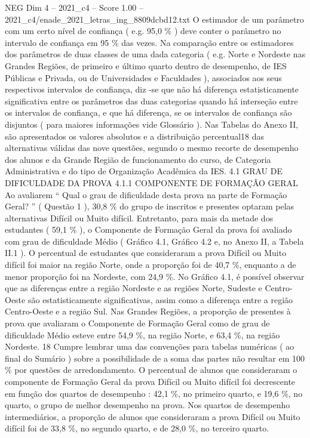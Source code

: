 \begin{textsample}{NEG Dim 4 – 2021\_c4 – Score 1.00 – 2021\_c4/enade\_2021\_letras\_ing\_8809dcbd12.txt}
O estimador de um parâmetro com um certo nível de confiança ( e.g. 95,0 \% ) deve conter o parâmetro no intervalo de confiança em 95 \% das vezes.
Na comparação entre os estimadores dos parâmetros de duas classes de uma dada categoria ( e.g.
Norte e Nordeste nas Grandes Regiões, de primeiro e último quarto dentro de desempenho, de IES Públicas e Privada, ou de Universidades e Faculdades ), associados aos seus respectivos intervalos de confiança, diz -se que não há diferença estatisticamente significativa entre os parâmetros das duas categorias quando há interseção entre os intervalos de confiança, e que há diferença, se os intervalos de confiança são disjuntos ( para maiores informações vide Glossário ).
Nas Tabelas do Anexo II, são apresentados os valores absolutos e a distribuição percentual18 das alternativas válidas das nove questões, segundo o mesmo recorte de desempenho dos alunos e da Grande Região de funcionamento do curso, de Categoria Administrativa e do tipo de Organização Acadêmica da IES. 4.1 GRAU DE DIFICULDADE DA PROVA 4.1.1 COMPONENTE DE FORMAÇÃO GERAL Ao avaliarem “ Qual o grau de dificuldade desta prova na parte de Formação Geral? ” ( Questão 1 ), 30,8 \% do grupo de inscritos e presentes optaram pelas alternativas Difícil ou Muito difícil.
Entretanto, para mais da metade dos estudantes ( 59,1 \% ), o Componente de Formação Geral da prova foi avaliado com grau de dificuldade Médio ( Gráfico 4.1, Gráfico 4.2 e, no Anexo II, a Tabela II.1 ).
O percentual de estudantes que consideraram a prova Difícil ou Muito difícil foi maior na região Norte, onde a proporção foi de 40,7 \%, enquanto a de menor proporção foi na Nordeste, com 24,9 \%.
No Gráfico 4.1, é possível observar que as diferenças entre a região Nordeste e as regiões Norte, Sudeste e Centro-Oeste são estatisticamente significativas, assim como a diferença entre a região Centro-Oeste e a região Sul.
Nas Grandes Regiões, a proporção de presentes à prova que avaliaram o Componente de Formação Geral como de grau de dificuldade Médio esteve entre 54,9 \%, na região Norte, e 63,4 \%, na região Nordeste. 18 Cumpre lembrar uma das convenções para tabelas numéricas ( ao final do Sumário ) sobre a possibilidade de a soma das partes não resultar em 100 \% por questões de arredondamento.
O percentual de alunos que consideraram o componente de Formação Geral da prova Difícil ou Muito difícil foi decrescente em função dos quartos de desempenho : 42,1 \%, no primeiro quarto, e 19,6 \%, no quarto, o grupo de melhor desempenho na prova.
Nos quartos de desempenho intermediários, a proporção de alunos que consideraram a prova Difícil ou Muito difícil foi de 33,8 \%, no segundo quarto, e de 28,0 \%, no terceiro quarto.

\end{textsample}
